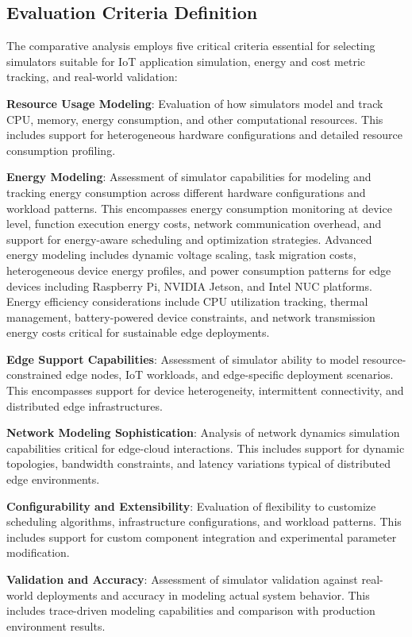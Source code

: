 \subsection{Evaluation Criteria Definition}

The comparative analysis employs five critical criteria essential for selecting simulators suitable for IoT application simulation, energy and cost metric tracking, and real-world validation:

\textbf{Resource Usage Modeling}: Evaluation of how simulators model and track CPU, memory, energy consumption, and other computational resources. This includes support for heterogeneous hardware configurations and detailed resource consumption profiling.

\textbf{Energy Modeling}: Assessment of simulator capabilities for modeling and tracking energy consumption across different hardware configurations and workload patterns. This encompasses energy consumption monitoring at device level, function execution energy costs, network communication overhead, and support for energy-aware scheduling and optimization strategies. Advanced energy modeling includes dynamic voltage scaling, task migration costs, heterogeneous device energy profiles, and power consumption patterns for edge devices including Raspberry Pi, NVIDIA Jetson, and Intel NUC platforms. Energy efficiency considerations include CPU utilization tracking, thermal management, battery-powered device constraints, and network transmission energy costs critical for sustainable edge deployments.

\textbf{Edge Support Capabilities}: Assessment of simulator ability to model resource-constrained edge nodes, IoT workloads, and edge-specific deployment scenarios. This encompasses support for device heterogeneity, intermittent connectivity, and distributed edge infrastructures.

\textbf{Network Modeling Sophistication}: Analysis of network dynamics simulation capabilities critical for edge-cloud interactions. This includes support for dynamic topologies, bandwidth constraints, and latency variations typical of distributed edge environments.

\textbf{Configurability and Extensibility}: Evaluation of flexibility to customize scheduling algorithms, infrastructure configurations, and workload patterns. This includes support for custom component integration and experimental parameter modification.

\textbf{Validation and Accuracy}: Assessment of simulator validation against real-world deployments and accuracy in modeling actual system behavior. This includes trace-driven modeling capabilities and comparison with production environment results.

